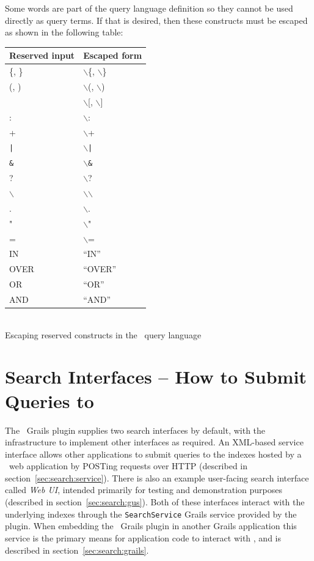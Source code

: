 Some words are part of the query language definition so they cannot be used
directly as query terms. If that is desired, then these constructs must be
escaped as shown in the following table:
\begin{center}
\begin{tabular}{|l|l|}
\hline
{\bf Reserved input} & {\bf Escaped form}\\
\hline \hline
\{, \} &  $\backslash$\{, $\backslash$\}\\
\hline
(, )  & $\backslash$(, $\backslash$) \\
\hline
[, ] & $\backslash$[, $\backslash$]\\
\hline
: &  $\backslash$: \\
\hline
+ &  $\backslash$+ \\
\hline
{\tt |} &  $\backslash${\tt |} \\
\hline
{\tt \&} &  $\backslash${\tt \&} \\
\hline
? &  $\backslash$? \\
\hline
$\backslash$ &  $\backslash$$\backslash$ \\
\hline
. &  $\backslash$. \\
\hline
" &  $\backslash$" \\
\hline 
=  & $\backslash$= \\
\hline
IN & ``IN'' \\
\hline
OVER & ``OVER''\\ 
\hline
OR & ``OR''\\ 
\hline
AND & ``AND''\\ 
\hline
\end{tabular}\\
\vspace{1ex}
Escaping reserved constructs in the \Mimir\ query language
\end{center}


\section{Search Interfaces -- How to Submit Queries to \Mimir}
\label{sec:search:interfaces}

The \Mimir\ Grails plugin supplies two search interfaces by default, with the
infrastructure to implement other interfaces as required.  An XML-based service
interface allows other applications to submit queries to the indexes hosted by
a \Mimir\ web application by POSTing requests over HTTP (described in
section~\ref{sec:search:service}).  There is also an example user-facing search
interface called {\em Web UI}, intended primarily for testing and demonstration
purposes (described in section~\ref{sec:search:gus}).  Both of these interfaces
interact with the underlying indexes through the {\tt SearchService} Grails
service provided by the plugin.  When embedding the \Mimir\ Grails plugin in
another Grails application this service is the primary means for application
code to interact with \Mimir, and is described in
section~\ref{sec:search:grails}.

